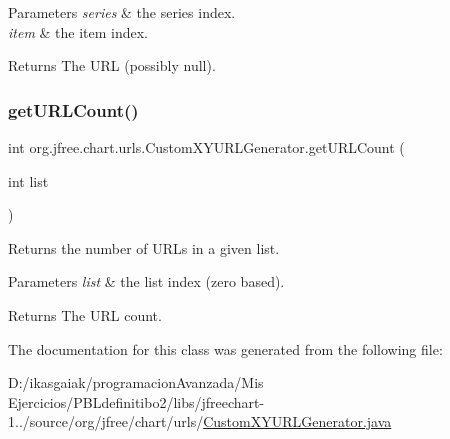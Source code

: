 \begin{DoxyParams}{Parameters}
{\em series} & the series index. \\
\hline
{\em item} & the item index.\\
\hline
\end{DoxyParams}
\begin{DoxyReturn}{Returns}
The U\+RL (possibly {\ttfamily null}). 
\end{DoxyReturn}
\mbox{\label{classorg_1_1jfree_1_1chart_1_1urls_1_1_custom_x_y_u_r_l_generator_ad9f2594429e851724748d984c1e23c99}} 
\subsubsection{\texorpdfstring{get\+U\+R\+L\+Count()}{getURLCount()}}
{\footnotesize\ttfamily int org.\+jfree.\+chart.\+urls.\+Custom\+X\+Y\+U\+R\+L\+Generator.\+get\+U\+R\+L\+Count (\begin{DoxyParamCaption}\item[{int}]{list }\end{DoxyParamCaption})}

Returns the number of U\+R\+Ls in a given list.


\begin{DoxyParams}{Parameters}
{\em list} & the list index (zero based).\\
\hline
\end{DoxyParams}
\begin{DoxyReturn}{Returns}
The U\+RL count. 
\end{DoxyReturn}


The documentation for this class was generated from the following file\+:\begin{DoxyCompactItemize}
\item 
D\+:/ikasgaiak/programacion\+Avanzada/\+Mis Ejercicios/\+P\+B\+Ldefinitibo2/libs/jfreechart-\/1../source/org/jfree/chart/urls/\mbox{\hyperlink{_custom_x_y_u_r_l_generator_8java}{Custom\+X\+Y\+U\+R\+L\+Generator.\+java}}\end{DoxyCompactItemize}
